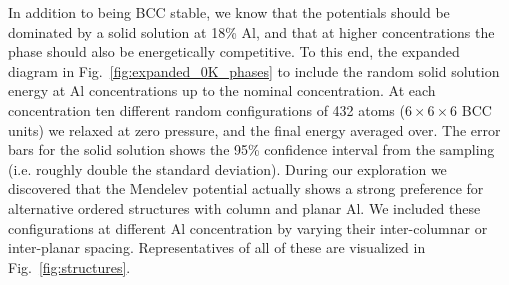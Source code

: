 In addition to being BCC stable, we know that the potentials should be dominated by a solid solution at 18\% Al, and that at higher concentrations the \DOTHREE phase should also be energetically competitive.
To this end, the expanded diagram in Fig.~\ref{fig:expanded_0K_phases} to include the random solid solution energy at Al concentrations up to the nominal \DOTHREE concentration.
At each concentration ten different random configurations of 432 atoms ($6\times6\times6$ BCC units) we relaxed at zero pressure, and the final energy averaged over.
The error bars for the solid solution shows the 95\% confidence interval from the sampling (i.e. roughly double the standard deviation).
During our exploration we discovered that the Mendelev potential actually shows a strong preference for alternative ordered structures with column and planar Al.
We included these configurations at different Al concentration by varying their inter-columnar or inter-planar spacing.
Representatives of all of these are visualized in Fig.~\ref{fig:structures}.
%
